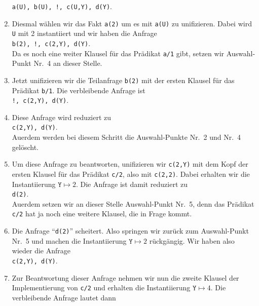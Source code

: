 \begin{enumerate}
      \hspace*{1.3cm} \texttt{a(U), b(U), !, c(U,Y), d(Y)}. 
\item Diesmal w\"{a}hlen wir das Fakt \texttt{a(2)} um es mit \texttt{a(U)} zu unifizieren.  Dabei wird \texttt{U} mit
      2 instantiiert und wir haben die  Anfrage \\[0.1cm]
      \hspace*{1.3cm} \texttt{b(2), !, c(2,Y), d(Y)}. \\[0.1cm]
      Da es noch eine weiter Klausel f\"{u}r das Pr\"{a}dikat \texttt{a/1} gibt, setzen wir 
      Auswahl-Punkt Nr.~4 an dieser Stelle.
\item Jetzt unifizieren wir  die Teilanfrage \texttt{b(2)} mit der ersten Klausel f\"{u}r das Pr\"{a}dikat
      \texttt{b/1}.  Die verbleibende Anfrage ist \\[0.1cm]
      \hspace*{1.3cm} \texttt{!, c(2,Y), d(Y)}. 
\item Diese Anfrage wird reduziert zu \\[0.1cm]
      \hspace*{1.3cm}  \texttt{c(2,Y), d(Y)}. \\[0.1cm]
      Au\3erdem werden bei diesem Schritt die Auswahl-Punkte Nr.~2 und Nr.~4 gel\"{o}scht.
\item Um diese Anfrage zu beantworten, unifizieren wir \texttt{c(2,Y)} mit dem Kopf der
      ersten Klausel f\"{u}r das Pr\"{a}dikat \texttt{c/2}, also mit \texttt{c(2,2)}.
      Dabei erhalten wir die Instantiierung
      $\mathtt{Y} \mapsto 2$.  Die Anfrage ist damit reduziert zu \\[0.1cm]
      \hspace*{1.3cm}  \texttt{d(2)}. \\[0.1cm]
      Au\3erdem setzen wir an dieser Stelle Auswahl-Punkt Nr.~5, denn das Pr\"{a}dikat
      \texttt{c/2} hat ja noch eine weitere Klausel, die in Frage kommt.
\item Die Anfrage ``\texttt{d(2)}'' scheitert.  Also springen wir zur\"{u}ck zum Auswahl-Punkt
      Nr.~5 und machen die Instantiierung $\mathtt{Y} \mapsto 2$ r\"{u}ckg\"{a}ngig.  Wir haben
      also wieder die Anfrage \\[0.1cm]
      \hspace*{1.3cm}  \texttt{c(2,Y), d(Y)}. 
\item Zur Beantwortung dieser Anfrage nehmen wir nun die zweite Klausel der
      Implementierung von \texttt{c/2} und erhalten die Instantiierung 
      $\mathtt{Y} \mapsto 4$.  Die verbleibende Anfrage lautet dann \\[0.1cm]

\end{enumerate}
